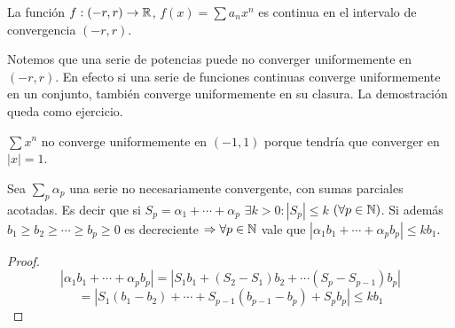 \begin{corollary}
  La función $f: (-r, r) \to \mathbb{R}$, $f(x) = \sum a_n x^n$ es continua en el intervalo de convergencia $(-r, r)$.
\end{corollary}

Notemos que una serie de potencias puede no converger uniformemente en $(-r, r)$. En efecto si una serie de funciones continuas converge uniformemente en un conjunto, también converge uniformemente en su clasura. La demostración queda como ejercicio.

\begin{eg}
  $\sum x^n$ no converge uniformemente en $(-1, 1)$ porque tendría que converger en $|x| = 1$.
\end{eg}

\begin{lemma}
  Sea $\sum_p \alpha_p$ una serie no necesariamente convergente, con sumas parciales acotadas. Es decir que si $S_p = \alpha_1 + \cdots + \alpha_p$ $\exists k > 0 : |S_p| \leq k$ $(\forall p \in \mathbb{N})$.
  Si además $b_1 \geq b_2 \geq \cdots \geq b_p \geq 0$ es decreciente $\Rightarrow \forall p \in \mathbb{N}$ vale que $|\alpha_1 b_1 + \cdots + \alpha_p b_p| \leq k b_1$.
  \begin{proof}
    \begin{equation}
      |\alpha_1 b_1 + \cdots + \alpha_p b_p| = |S_1 b_1 + (S_2 - S_1) b_2 + \cdots (S_p - S_{p-1}) b_p|
    \end{equation}
    \begin{equation}
      = |S_1 (b_1 - b_2) + \cdots + S_{p-1} (b_{p-1} - b_p) + S_p b_p| \leq k b_1
    \end{equation}
  \end{proof}
\end{lemma}

